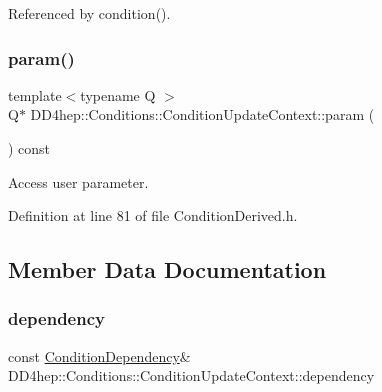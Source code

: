 Referenced by condition().

\hypertarget{class_d_d4hep_1_1_conditions_1_1_condition_update_context_aac0cc2ba0b37615704bf8e24bd5942de}{}\label{class_d_d4hep_1_1_conditions_1_1_condition_update_context_aac0cc2ba0b37615704bf8e24bd5942de} 
\subsubsection{\texorpdfstring{param()}{param()}}
{\footnotesize\ttfamily template$<$typename Q $>$ \\
Q$\ast$ D\+D4hep\+::\+Conditions\+::\+Condition\+Update\+Context\+::param (\begin{DoxyParamCaption}{ }\end{DoxyParamCaption}) const\hspace{0.3cm}{\ttfamily [inline]}}



Access user parameter. 



Definition at line 81 of file Condition\+Derived.\+h.



\subsection{Member Data Documentation}
\hypertarget{class_d_d4hep_1_1_conditions_1_1_condition_update_context_aaea028db7dc9ed95d2a5f34a4a2a3efd}{}\label{class_d_d4hep_1_1_conditions_1_1_condition_update_context_aaea028db7dc9ed95d2a5f34a4a2a3efd} 
\subsubsection{\texorpdfstring{dependency}{dependency}}
{\footnotesize\ttfamily const \hyperlink{class_d_d4hep_1_1_conditions_1_1_condition_dependency}{Condition\+Dependency}\& D\+D4hep\+::\+Conditions\+::\+Condition\+Update\+Context\+::dependency}



